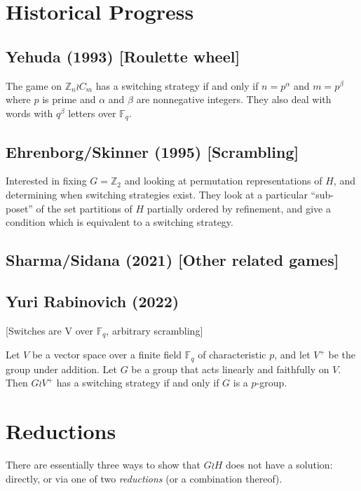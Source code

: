 %
%
\section{Historical Progress}
\label{sec:HistoricalProgress}
\subsection{Yehuda (1993) [Roulette wheel]}
\begin{theorem}
  The game on $\mathbb Z_{n} \wr C_{m}$ has a switching strategy if and only if
  $n = p^\alpha$ and $m = p^\beta$ where $p$ is prime and $\alpha$ and $\beta$
  are nonnegative integers. They also deal with words with $q^\beta$ letters
  over $\mathbb F_q$.
\end{theorem}
\subsection{Ehrenborg/Skinner (1995) [Scrambling]}
\begin{theorem}
Interested in fixing $G = \mathbb Z_2$ and looking at permutation
representations of $H$, and determining when switching strategies exist.
They look at a particular ``sub-poset'' of the set partitions of $H$ partially
ordered by refinement, and give a condition which is equivalent to a switching
strategy.
\end{theorem}
\subsection{Sharma/Sidana (2021) [Other related games]}
\subsection{Yuri Rabinovich (2022)}
[Switches are V over $\mathbb F_q$, arbitrary scrambling]

\begin{theorem}
  Let $V$ be a vector space over a finite field $\mathbb F_q$ of characteristic
  $p$, and let $V^+$ be the group under addition.
  Let $G$ be a group that acts linearly and faithfully on $V$.
  Then $G \wr V^+$ has a switching strategy if and only if $G$ is a $p$-group.
\end{theorem}
\section{Reductions}
\label{sec:Reductions}
There are essentially three ways to show that $G \wr H$ does not have a
solution: directly, or via one of two \textit{reductions} (or a combination thereof).

